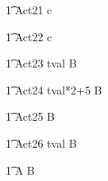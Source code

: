 \begin{circusaction}
	\t1 Act21 \circdef c \then   {} \rcirctime \circstartby \Skip \\
\end{circusaction}


\begin{circusaction}
	\t1 Act22 \circdef c \then    {} \rcirctime \circstartby \Stop \\
\end{circusaction}


\begin{circusaction}
	\t1 Act23 \circdef   \lcirctime tval \rcirctime \circstartby B \\
\end{circusaction}

\begin{circusaction}
	\t1 Act24 \circdef   \lcirctime tval*2+5 \rcirctime \circstartby B \\
\end{circusaction}
 


\begin{circusaction}
    	\t1 Act25 \circdef  {}  \rcirctime \circstartby B \\
\end{circusaction}

\begin{circusaction}
    	\t1 Act26 \circdef   {} \upto tval \rcirctime \circstartby B \\
\end{circusaction}



\begin{circusaction}        
        \t1 \circspot A \circseq B\\
\end{circusaction}

\begin{circus}    
\circend
\end{circus}
